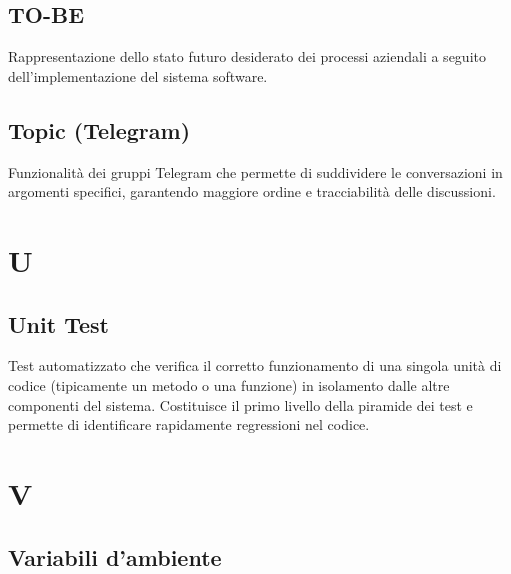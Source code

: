 \documentclass[a4paper, 11pt, oneside]{scrartcl} %
\begin{document}
\subsection*{TO-BE}
Rappresentazione dello stato futuro desiderato dei processi aziendali a seguito dell'implementazione del sistema software.
\vspace{0.5cm}

\subsection*{Topic (Telegram)}


Funzionalità dei gruppi Telegram che permette di suddividere le conversazioni in argomenti specifici, garantendo maggiore ordine e tracciabilità delle discussioni.

\vspace{0.5cm}


\section*{U}


\subsection*{Unit Test}
Test automatizzato che verifica il corretto funzionamento di una singola unità di codice (tipicamente un metodo o una funzione) in isolamento dalle altre componenti del sistema. Costituisce il primo livello della piramide dei test e permette di identificare rapidamente regressioni nel codice.
\vspace{0.5cm}


\section*{V}


\subsection*{Variabili d'ambiente}

\end{document}

